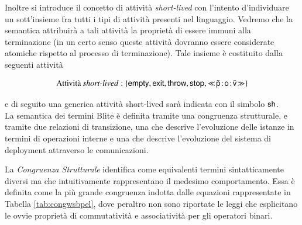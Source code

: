 Inoltre si introduce il concetto di attività \emph{short-lived} con l'intento
d'individuare un sott'insieme fra tutti i tipi di attività presenti nel
linguaggio. Vedremo che la semantica attribuirà a tali attività la proprietà di
essere immuni alla terminazione (in un certo senso queste attività
dovranno essere considerate atomiche rispetto al processo di terminazione).
Tale insieme è costituito dalla seguenti attività

$$
\textrm{Attività \emph{short-lived}} : \{ {\sf empty}, {\sf exit},
{\sf throw}, {\sf stop}, \ll\!\tilde{{\sf p}}\! : \! {\sf o}\! : \! \bar{{\sf v}}\!\gg \}
$$

e di seguito una generica attività short-lived sarà indicata con
il simbolo ${\sf sh}$.
\\

La semantica dei termini Blite è definita tramite una congruenza strutturale, e
tramite due relazioni di transizione, una che descrive l'evoluzione delle
istanze in termini di operazioni interne e una che descrive l'evoluzione del sistema
di deployment attraverso le comunicazioni. 

La \emph{Congruenza Strutturale} identifica come equivalenti termini
sintatticamente diversi ma che intuitivamente rappresentano il medesimo
comportamento. Essa è definita come la più grande congruenza indotta dalle
equazioni rappresentate in Tabella \ref{tab:congwsbpel}, dove peraltro non sono
riportate le leggi che esplicitano le ovvie proprietà di
commutatività e associatività per gli operatori binari.


